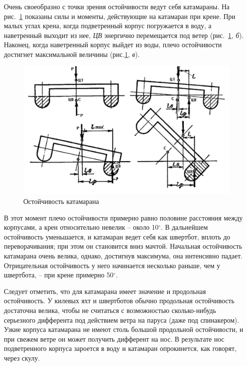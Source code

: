 \documentclass[a4paper, 12pt, twoside, final]{scrbook}
\begin{document}
Очень своеобразно с точки зрения остойчивости ведут себя катамараны. На рис.~\ref{fig:81} показаны силы и моменты, действующие на катамаран при крене. При малых углах крена, когда подветренный корпус погружается в воду, а наветренный выходит из нее, \textit{ЦВ} энергично перемещается под ветер (рис.~\ref{fig:81}, \textit{б}). Наконец, когда наветренный корпус выйдет из воды, плечо остойчивости достигнет максимальной величины (рис.\ref{fig:81}, \textit{в}).

\begin{figure}[htbp]
   \centering
   \includegraphics{81_Ostojchevost_katamarana} %
   \caption{Остойчивость катамарана}
   \label{fig:81}
\end{figure}

В этот момент плечо остойчивости примерно равно половине расстояния между корпусами, а крен относительно невелик \--- около 10$^\circ$. В дальнейшем остойчивость уменьшается, и катамаран ведет себя как швертбот, вплоть до переворачивания; при этом он становится вниз мачтой. Начальная остойчивость катамарана очень велика, однако, достигнув максимума, она интенсивно падает. Отрицательная остойчивость у него начинается несколько раньше, чем у швертбота, \--- при крене примерно 50$^\circ$.

Следует отметить, что для катамарана имеет значение и продольная остойчивость. У килевых яхт и швертботов обычно продольная остойчивость достаточна велика, чтобы не считаться с возможностью сколько-нибудь серьезного дифферента под действием ветра на паруса (даже под спинакером). Узкие корпуса катамарана не имеют столь большой продольной остойчивости, и при свежем ветре он может получить дифферент на нос. В результате нос подветренного корпуса зароется в воду и катамаран опрокинется, как говорят, через скулу.
\end{document}
